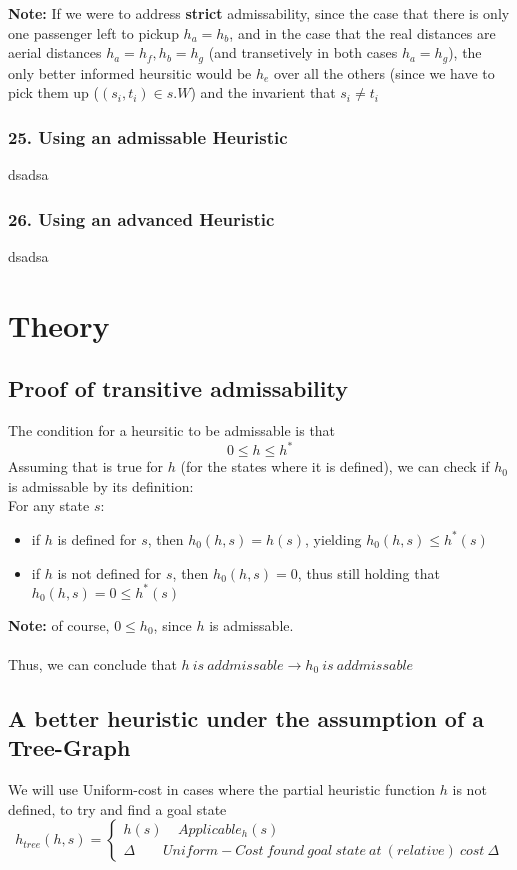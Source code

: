 \documentclass{article}
\begin{document}
\textbf{Note:} If we were to address \textbf{strict} admissability, since the case that there is only one passenger left to pickup $h_a = h_b$, and in the case that the real distances are aerial distances $h_a = h_f, h_b = h_g$ (and transetively in both cases $h_a = h_g$), the only better informed heursitic would be $h_e$ over all the others (since we have to pick them up ($(s_i,  t_i) \in s.W$) and the invarient that $s_i \neq t_i$

\subsubsection*{25. Using an admissable Heuristic}
dsadsa

\subsubsection*{26. Using an advanced Heuristic}
dsadsa

\section {Theory}
\subsection*{Proof of transitive admissability}
The condition for a heursitic to be admissable is that 
$$ 0 \leq h \leq h^* $$
Assuming that is true for $h$ (for the states where it is defined), we can check if $h_0$ is admissable by its definition: \\ 
For any state $s$:
\begin{itemize}
\item if $h$ is defined for $s$, then $h_0(h,s) = h(s)$, yielding $h_0(h,s) \leq h^*(s) $
\item if $h$ is not defined for $s$, then $h_0(h,s) = 0$, thus still holding that $  h_0(h,s) = 0 \leq h^*(s) $
\end{itemize}

\textbf{Note: } of course, $0 \leq h_0$, since $h$ is admissable. \\ \\

Thus, we can conclude that $ h\ is\ addmissable \rightarrow h_0\ is\ addmissable $

\subsection*{A better heuristic under the assumption of a Tree-Graph}
We will use Uniform-cost in cases where the partial heuristic function $h$ is not defined, to try and find a goal state
\[
  h_{tree}(h,s)=\begin{cases}
               h(s) \ \ \ \ \  Applicable_h(s) \\
               \Delta \ \ \ \ \ \ \ \  \  Uniform-Cost\ found\ goal\ state\ at\ (relative)\ cost\ \Delta
            \end{cases}
\]
\end{document}
